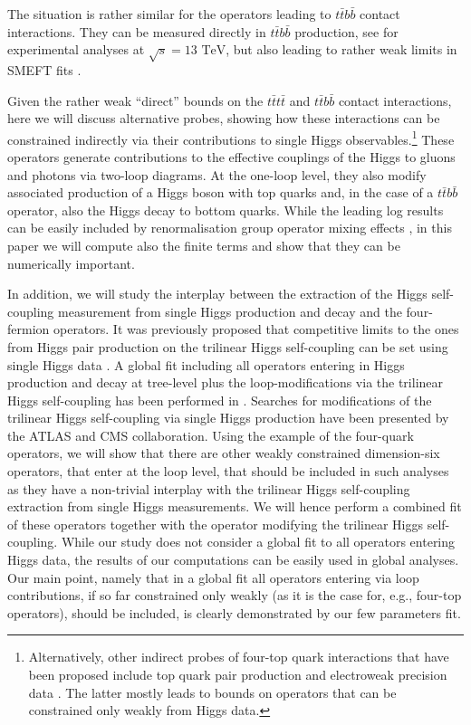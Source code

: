 The situation is rather similar for the operators leading to $t\bar{t}b\bar{b}$ contact interactions. They can be measured directly in $t\bar{t}b\bar{b}$ production, see \cite{Sirunyan:2020kgar, ATLAS:2018gug} for experimental analyses at $\sqrt{s}=13\text{ TeV}$, but also leading to rather weak limits in SMEFT fits \cite{DHondt:2018cww, Hartland:2019bjb}.
\par
Given the rather weak ``direct'' bounds on the $t\bar{t}t\bar{t}$ and $t\bar{t}b\bar{b}$ contact interactions, here we will discuss alternative probes, showing how these interactions can be constrained indirectly via their contributions to single Higgs observables.\footnote{Alternatively, other indirect probes of four-top quark interactions that have been proposed include top quark pair production \cite{Degrande:2020evl} and electroweak precision data \cite{deBlas:2015aea}. The latter mostly leads to bounds on operators that can be constrained only weakly from Higgs data.}
These operators generate contributions to the effective couplings of the Higgs to gluons and photons via two-loop diagrams. At the one-loop level, they also modify associated production of a Higgs boson with top quarks and, in the case of a $t\bar{t}b\bar{b}$ operator, also the Higgs decay to bottom quarks. While the leading log results can be easily included by renormalisation group operator mixing effects \cite{Jenkins:2013zja, Jenkins:2013wua, Alonso:2013hga}, in this paper we will compute also the finite terms and show that they can be numerically important.
\par
In addition, we will study the interplay between the extraction of the Higgs self-coupling measurement from single Higgs production and decay and the four-fermion operators.
It was previously proposed that competitive limits 
to the ones from Higgs pair production on the trilinear Higgs self-coupling can be set using single Higgs data \cite{McCullough:2013rea, Gorbahn:2016uoy, Degrassi:2016wml, Bizon:2016wgr, Maltoni:2017ims, Degrassi:2019yix, Degrassi:2021uik, Haisch:2021hvy}.  A global fit including all operators entering in Higgs production and decay at tree-level plus the loop-modifications via the trilinear Higgs self-coupling has been performed in \cite{DiVita:2017eyz}. 
Searches for modifications of the trilinear Higgs self-coupling via single Higgs production have been presented by the ATLAS  \cite{ATLAS:2019pbo} and CMS \cite{CMS:2020gsy} collaboration. Using the example of the four-quark operators, we will show that there are other weakly constrained dimension-six  operators, that enter at the loop level, that should be included in such analyses as they have a non-trivial interplay with the trilinear Higgs self-coupling extraction from single Higgs measurements. We will hence perform a combined fit of these operators together with the operator modifying the trilinear Higgs self-coupling. While our study does not consider a global fit to all operators entering Higgs data, the results of our computations can be easily used in global analyses. Our main point, namely that in a global fit all operators entering via loop contributions, if so far constrained only weakly (as it is the case for, e.g., four-top operators), should be included, is clearly demonstrated by our few parameters fit. 
